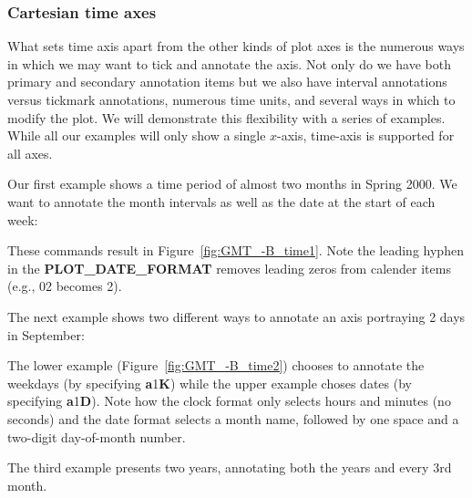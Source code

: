 
\subsubsection{Cartesian time axes}

What sets time axis apart from the other kinds of plot axes is the numerous ways in which we
may want to tick and annotate the axis.  Not only do we have both primary and secondary annotation
items but we also have interval annotations versus tickmark annotations, numerous time units,
and several ways in which to modify the plot.  We will demonstrate this flexibility with a
series of examples.  While all our examples will only show a single $x$-axis, time-axis is supported for all axes.

Our first example shows a time period of almost two months in Spring 2000.  We want to annotate the month
intervals as well as the date at the start of each week:



These commands result in Figure~\ref{fig:GMT_-B_time1}.  Note the leading hyphen in the {\bf PLOT\_DATE\_FORMAT}
removes leading zeros from calender items (e.g., 02 becomes 2).

The next example shows two different ways to annotate an axis portraying 2 days in September:



The lower example (Figure~\ref{fig:GMT_-B_time2}) chooses to annotate the weekdays (by specifying {\bf a}1{\bf K}) while the upper
example choses dates (by specifying {\bf a}1{\bf D}).  Note how the clock format only selects hours and minutes (no seconds) and
the date format selects a month name, followed by one space and a two-digit day-of-month number.


The third example presents two years, annotating both the years and every 3rd month.

